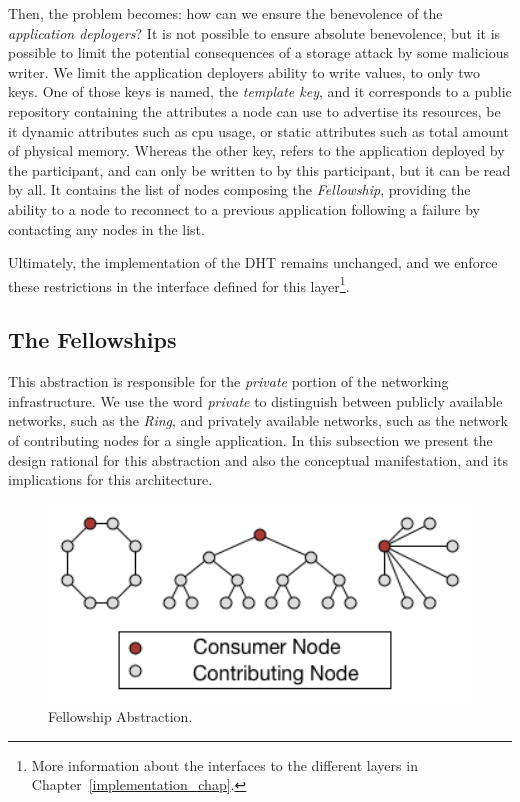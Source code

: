 \documentclass[12pt, titlepage]{uo_temp}
\begin{document}
     Then, the problem becomes: how can we ensure the benevolence of the \emph{application
       deployers}? It is not possible to ensure absolute benevolence, but it is possible
     to limit the potential consequences of a storage attack by some malicious writer. We
     limit the application deployers ability to write values, to only two keys. One of
     those keys is named, the \emph{template key}, and it corresponds to a public
     repository containing the attributes a node can use to advertise its resources, be it
     dynamic attributes such as \gls{cpu} usage, or static attributes such as total amount
     of physical memory. Whereas the other key, refers to the application deployed by the
     participant, and can only be written to by this participant, but it can be read by
     all. It contains the list of nodes composing the \emph{Fellowship}, providing the
     ability to a node to reconnect to a previous application following a failure by
     contacting any nodes in the list.
     
     Ultimately, the implementation of the DHT remains unchanged, and we enforce these
     restrictions in the interface defined for this layer\footnote{More information
       about the interfaces to the different layers in Chapter~\ref{implementation_chap}.}.

     \subsection{The Fellowships}
     This abstraction is responsible for the \emph{private} portion of the networking
     infrastructure. We use the word \emph{private} to distinguish between publicly
     available networks, such as the \emph{Ring}, and privately available networks, such
     as the network of contributing nodes for a single application. In this subsection we
     present the design rational for this abstraction and also the conceptual
     manifestation, and its implications for this architecture. 

     \begin{figure}
       \centering
       \includegraphics[width=125mm]{images/arch_fellowship.png}
       \caption{Fellowship Abstraction.}
     \end{figure}
\end{document}
